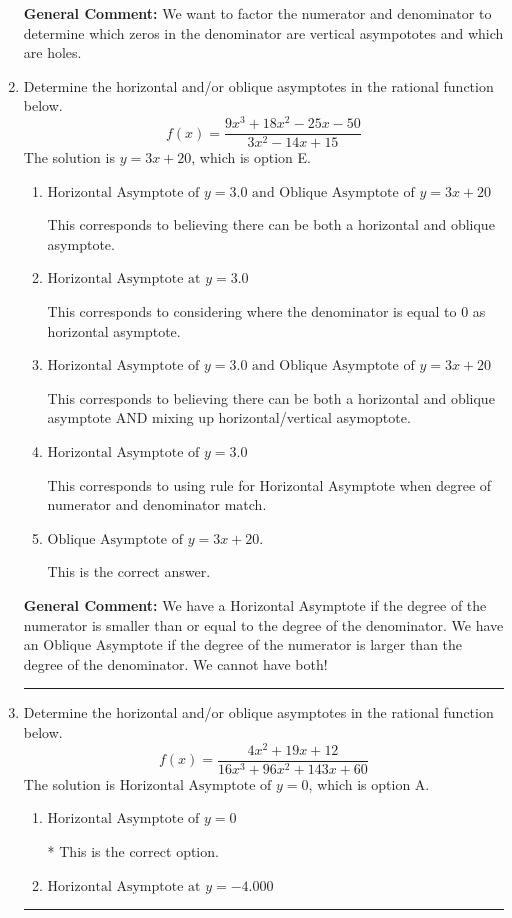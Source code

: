 \documentclass{extbook}[14pt]
\newcommand{\litem}[1]{\item #1

\rule{\textwidth}{0.4pt}}
\begin{document}
\begin{enumerate}
{\textbf{General Comment:} We want to factor the numerator and denominator to determine which zeros in the denominator are vertical asympototes and which are holes.
}
\litem{
Determine the horizontal and/or oblique asymptotes in the rational function below.
\[ f(x) = \frac{9x^{3} +18 x^{2} -25 x -50}{3x^{2} -14 x + 15} \]The solution is \( y = 3x + 20 \), which is option E.\begin{enumerate}[label=\Alph*.]
\item \( \text{Horizontal Asymptote of } y = 3.0 \text{ and Oblique Asymptote of } y = 3x + 20 \)

This corresponds to believing there can be both a horizontal and oblique asymptote.
\item \( \text{Horizontal Asymptote at } y = 3.0 \)

This corresponds to considering where the denominator is equal to 0 as horizontal asymptote.
\item \( \text{Horizontal Asymptote of } y = 3.0 \text{ and Oblique Asymptote of } y = 3x + 20 \)

This corresponds to believing there can be both a horizontal and oblique asymptote AND mixing up horizontal/vertical asymoptote.
\item \( \text{Horizontal Asymptote of } y = 3.0  \)

This corresponds to using rule for Horizontal Asymptote when degree of numerator and denominator match.
\item \( \text{Oblique Asymptote of } y = 3x + 20. \)

This is the correct answer.
\end{enumerate}

\textbf{General Comment:} We have a Horizontal Asymptote if the degree of the numerator is smaller than or equal to the degree of the denominator. We have an Oblique Asymptote if the degree of the numerator is larger than the degree of the denominator. We cannot have both!
}
\litem{
Determine the horizontal and/or oblique asymptotes in the rational function below.
\[ f(x) = \frac{4x^{2} +19 x + 12}{16x^{3} +96 x^{2} +143 x + 60} \]The solution is \( \text{Horizontal Asymptote of } y = 0 \), which is option A.\begin{enumerate}[label=\Alph*.]
\item \( \text{Horizontal Asymptote of } y = 0 \)

* This is the correct option.
\item \( \text{Horizontal Asymptote at } y = -4.000 \)


\end{enumerate}}
\end{enumerate}
\end{document}
